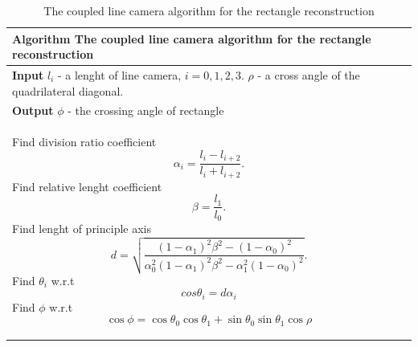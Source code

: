 \documentclass[master,korean,final]{cbnu-ecs}
\begin{document}
\begin{table}[!t] 
\caption{The coupled line camera algorithm for the rectangle reconstruction}
\label{CLC_algorithm}
\begin{tabular}{p{360pt}}
\toprule[1.5pt]
\textbf{Algorithm} The coupled line camera algorithm for the rectangle reconstruction\\
\hline

\textbf{Input}		$l_i$ - a lenght of line camera, $i=0,1,2,3$.
					$\rho$ - a cross angle of the quadrilateral diagonal.\\
\textbf{Output}		$\phi$ - the crossing angle of rectangle
\\

\hline
\begin{algorithmic}[1]
\For{$i=0,1$}
\State Find division ratio coefficient
\[
\alpha_i = \frac{l_i - l_{i+2}}{l_i + l_{i+2}}.
\]
\EndFor
\State Find relative lenght coefficient
\[
\beta = \frac{l_1}{l_0}.
\]
\State Find lenght of principle axis
\[
d = \sqrt{\frac{(1-\alpha_1)^2\beta^2-(1-\alpha_0)^2}{\alpha_0^2(1-\alpha_1)^2\beta^2-\alpha_1^2(1-\alpha_0)^2}}.
\]
\For{$i=0,1$}
\State Find $\theta_i$ w.r.t
\[
cos\theta_i = d\alpha_i
\]
\EndFor
\State Find $\phi$ w.r.t
\[
	\cos{\phi} = \cos{\theta_0}\cos{\theta_1} + \sin{\theta_0}\sin{\theta_1}\cos{\rho}
\]
\end{algorithmic}\\
\toprule[1.5pt]
\end{tabular}
\end{table}

\newpage
\end{document}
